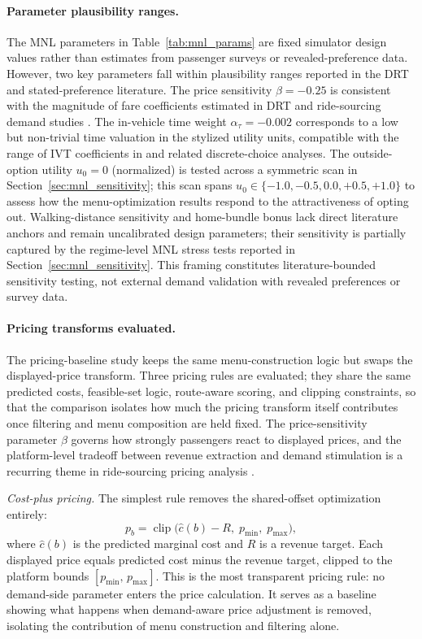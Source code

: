 \paragraph{Parameter plausibility ranges.}
The MNL parameters in Table~\ref{tab:mnl_params} are fixed simulator design values rather than estimates from passenger surveys or revealed-preference data. However, two key parameters fall within plausibility ranges reported in the DRT and stated-preference literature. The price sensitivity $\beta = -0.25$ is consistent with the magnitude of fare coefficients estimated in DRT and ride-sourcing demand studies \citep{zha2019surge,diana2012stated}. The in-vehicle time weight $\alpha_{\tau} = -0.002$ corresponds to a low but non-trivial time valuation in the stylized utility units, compatible with the range of IVT coefficients in \citet{ben1985discrete} and related discrete-choice analyses. The outside-option utility $u_0 = 0$ (normalized) is tested across a symmetric scan in Section~\ref{sec:mnl_sensitivity}; this scan spans $u_0 \in \{-1.0, -0.5, 0.0, +0.5, +1.0\}$ to assess how the menu-optimization results respond to the attractiveness of opting out. Walking-distance sensitivity and home-bundle bonus lack direct literature anchors and remain uncalibrated design parameters; their sensitivity is partially captured by the regime-level MNL stress tests reported in Section~\ref{sec:mnl_sensitivity}. This framing constitutes literature-bounded sensitivity testing, not external demand validation with revealed preferences or survey data.

\paragraph{Pricing transforms evaluated.} The pricing-baseline study keeps the same menu-construction logic but swaps the displayed-price transform. Three pricing rules are evaluated; they share the same predicted costs, feasible-set logic, route-aware scoring, and clipping constraints, so that the comparison isolates how much the pricing transform itself contributes once filtering and menu composition are held fixed. The price-sensitivity parameter $\beta$ governs how strongly passengers react to displayed prices, and the platform-level tradeoff between revenue extraction and demand stimulation is a recurring theme in ride-sourcing pricing analysis \citep{zha2019surge}.

\emph{Cost-plus pricing.} The simplest rule removes the shared-offset optimization entirely:
\[
  p_b = \operatorname{clip}\!\bigl(\hat{c}(b) - R,\; p_{\min},\; p_{\max}\bigr),
\]
where $\hat{c}(b)$ is the predicted marginal cost and $R$ is a revenue target. Each displayed price equals predicted cost minus the revenue target, clipped to the platform bounds $[p_{\min},\, p_{\max}]$. This is the most transparent pricing rule: no demand-side parameter enters the price calculation. It serves as a baseline showing what happens when demand-aware price adjustment is removed, isolating the contribution of menu construction and filtering alone.

